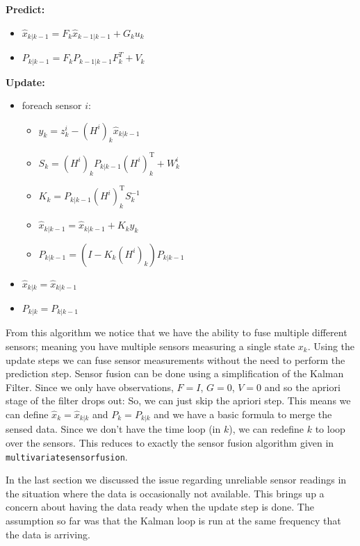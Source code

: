 \textbf{Predict:}

\begin{itemize}
\tightlist
\item
  \(\hat{x}_{k|k-1} = F_{k}\hat{x}_{k-1|k-1} + G_{k} u_{k}\)
\item
  \(P_{k|k-1} = F_{k} P_{k-1|k-1} F_{k}^{T} + V_{k}\)
\end{itemize}

\textbf{Update:}

\begin{itemize}
\tightlist
\item
  foreach sensor \(i\):

  \begin{itemize}
  \tightlist
  \item
    \(y_k = z_k^i - (H^i)_k\hat{x}_{k|k-1}\)
  \item
    \(S_k = (H^i)_k P_{k|k-1} (H^i)_k^\text{T} + W_k^i\)
  \item
    \(K_k = P_{k|k-1}(H^i)_k^\text{T}S_k^{-1}\)
  \item
    \(\hat{x}_{k|k-1} = \hat{x}_{k|k-1} + K_k y_k\)
  \item
    \(P_{k|k-1} = (I - K_k (H^i)_k) P_{k|k-1}\)
  \end{itemize}
\item
  \(\hat{x}_{k|k} = \hat{x}_{k|k-1}\)
\item
  \(P_{k|k} = P_{k|k-1}\)
\end{itemize}

From this algorithm we notice that we have the ability to fuse multiple
different sensors; meaning you have multiple sensors measuring a single
state \(x_k\). Using the update steps we can fuse sensor measurements
without the need to perform the prediction step. Sensor fusion can be
done using a simplification of the Kalman Filter. Since we only have
observations, \(F=I\), \(G=0\), \(V=0\) and so the apriori stage of the
filter drops out: So, we can just skip the apriori step. This means we
can define \(\hat{x}_{k}  = \hat{x}_{k|k}\) and \(P_{k} = P_{k|k}\) and
we have a basic formula to merge the sensed data. Since we don't have
the time loop (in \(k\)), we can redefine \(k\) to loop over the
sensors. This reduces to exactly the sensor fusion algorithm given in
\texttt{multivariatesensorfusion}.

In the last section we discussed the issue regarding unreliable sensor
readings in the situation where the data is occasionally not available.
This brings up a concern about having the data ready when the update
step is done. The assumption so far was that the Kalman loop is run at
the same frequency that the data is arriving.

